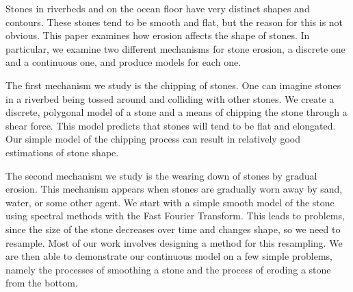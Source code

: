 Stones in riverbeds and on the ocean floor have very distinct shapes and contours. These stones tend to be smooth and flat, but the reason for this is not obvious. This paper examines how erosion affects the shape of stones. In particular, we examine two different mechanisms for stone erosion, a discrete one and a continuous one, and produce models for each one.

The first mechanism we study is the chipping of stones. One can imagine stones in a riverbed being tossed around and colliding with other stones. We create a discrete, polygonal model of a stone and a means of chipping the stone through a shear force. This model predicts that stones will tend to be flat and elongated. Our simple model of the chipping process can result in relatively good estimations of stone shape.

The second mechanism we study is the wearing down of stones by gradual erosion. This mechanism appears when stones are gradually worn away by sand, water, or some other agent. We start with a simple smooth model of the stone using spectral methods with the Fast Fourier Transform. This leads to problems, since the size of the stone decreases over time and changes shape, so we need to resample. Most of our work involves designing a method for this resampling. We are then able to demonstrate our continuous model on a few simple problems, namely the processes of smoothing a stone and the process of eroding a stone from the bottom.
